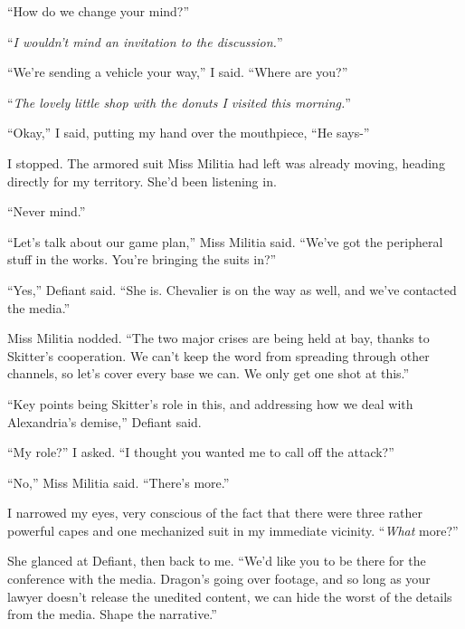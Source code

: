 ``How do we change your mind?''



``\emph{I wouldn't mind an invitation to the discussion.}''



``We're sending a vehicle your way,'' I said.  ``Where are you?''



``\emph{The lovely little shop with the donuts I visited this morning.}''



``Okay,'' I said, putting my hand over the mouthpiece, ``He says-''



I stopped.  The armored suit Miss Militia had left was already moving, heading directly for my territory.  She'd been listening in.



``Never mind.''



``Let's talk about our game plan,'' Miss Militia said.  ``We've got the peripheral stuff in the works.  You're bringing the suits in?''



``Yes,'' Defiant said.  ``She is.  Chevalier is on the way as well, and we've contacted the media.''



Miss Militia nodded.  ``The two major crises are being held at bay, thanks to Skitter's cooperation.  We can't keep the word from spreading through other channels, so let's cover every base we can.  We only get one shot at this.''



``Key points being Skitter's role in this, and addressing how we deal with Alexandria's demise,'' Defiant said.



``My role?'' I asked.  ``I thought you wanted me to call off the attack?''



``No,'' Miss Militia said.  ``There's more.''



I narrowed my eyes, very conscious of the fact that there were three rather powerful capes and one mechanized suit in my immediate vicinity.  ``\emph{What} more?''



She glanced at Defiant, then back to me.  ``We'd like you to be there for the conference with the media.  Dragon's going over footage, and so long as your lawyer doesn't release the unedited content, we can hide the worst of the details from the media.  Shape the narrative.''



